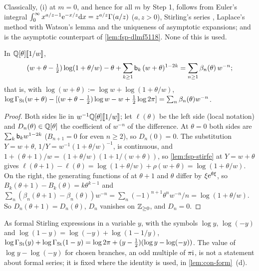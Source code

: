 \begin{rmk}
\label{rmk:fsp-classical}
Classically, (i) at $m=0$, and hence for all $m$ by Step 1, follows from Euler's integral $\int_0^\infty x^{a/z-1}\mathrm{e}^{-x/z}\mathrm{d} x=z^{a/z}\Gamma(a/z)$ ($a,z>0$), Stirling's series \cite[5.11.1]{DLMF}, Laplace's method with Watson's lemma \cite[2.3.8]{DLMF} and the uniqueness of asymptotic expansions; and \cite[5.11.8]{DLMF} is the asymptotic counterpart of \cref{lem:fsp-dlmf5118}. None of this is used.
\end{rmk}

\begin{lem}
\label{lem:fsp-dlmf5118}
In $\mathbb{Q}[\theta][\![ 1/w ]\!]$,
\begin{equation}
\label{eq:fsp-5118}
(w+\theta-\tfrac12)\log(1+\theta/w)-\theta+\sum_{k\geq1}\mathsf{b}_k\,(w+\theta)^{1-2k}=\sum_{n\geq1}\beta_n(\theta)\,w^{-n};
\end{equation}
that is, with $\log(w+\theta):=\log w+\log(1+\theta/w)$, $\log\Gamma_{\mathrm{St}}(w+\theta)-[(w+\theta-\frac12)\log w-w+\frac12\log2\pi]=\sum_n\beta_n(\theta)w^{-n}$.
\end{lem}

\begin{proof}
Both sides lie in $w^{-1}\mathbb{Q}[\theta][\![ 1/w ]\!]$; let $\ell(\theta)$ be the left side (local notation) and $D_n(\theta)\in\mathbb{Q}[\theta]$ the coefficient of $w^{-n}$ of the difference. At $\theta=0$ both sides are $\sum_k\mathsf{b}_kw^{1-2k}$ ($B_{n+1}=0$ for even $n\geq2$), so $D_n(0)=0$. The substitution $Y=w+\theta$, $1/Y=w^{-1}(1+\theta/w)^{-1}$, is continuous, and $1+(\theta+1)/w=(1+\theta/w)(1+1/(w+\theta))$, so \cref{lem:fsp-stirfe} at $Y=w+\theta$ gives $\ell(\theta+1)-\ell(\theta)=\log(1+\theta/w)+\rho(w+\theta)=\log(1+\theta/w)$. On the right, the generating functions of \cite[24.2.3]{DLMF} at $\theta+1$ and $\theta$ differ by $\xi\mathrm{e}^{\theta\xi}$, so $B_k(\theta+1)-B_k(\theta)=k\theta^{k-1}$ \cite[24.4.1]{DLMF} and $\sum_n(\beta_n(\theta+1)-\beta_n(\theta))w^{-n}=\sum_n(-1)^{n+1}\theta^nw^{-n}/n=\log(1+\theta/w)$. So $D_n(\theta+1)=D_n(\theta)$, $D_n$ vanishes on $\mathbb{Z}_{\geq0}$, and $D_n=0$.
\end{proof}

\begin{lem}[Reflection]
\label{lem:fsp-refl}
As formal Stirling expressions in a variable $y$, with the symbols $\log y$, $\log(-y)$ and $\log(1-y)=\log(-y)+\log(1-1/y)$,
$\log\Gamma_{\mathrm{St}}(y)+\log\Gamma_{\mathrm{St}}(1-y)=\log2\pi+(y-\frac12)(\log y-\log(-y))$. The value of $\log y-\log(-y)$ for chosen branches, an odd multiple of $\pi\mathrm{i}$, is not a statement about formal series; it is fixed where the identity is used, in \cref{lem:con-form}~(d).
\end{lem}

